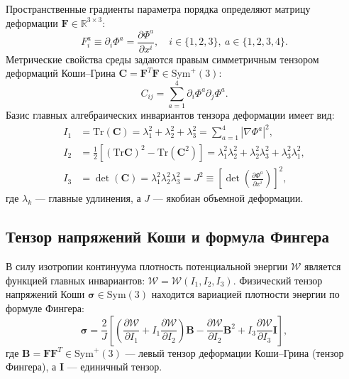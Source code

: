 \documentclass[11pt,a4paper]{article}
\theoremstyle{definition}
\theoremstyle{remark}
\begin{document}
Пространственные градиенты параметра порядка определяют матрицу деформации $\mathbf{F} \in \mathbb{R}^{3 \times 3}$:
\begin{equation}
    F_i^a \equiv \partial_i \Phi^a = \frac{\partial \Phi^a}{\partial x^i}, \quad i \in \{1,2,3\}, \ a \in \{1,2,3,4\}.
\end{equation}
Метрические свойства среды задаются правым симметричным тензором деформаций Коши--Грина $\mathbf{C} = \mathbf{F}^T \mathbf{F} \in \mathrm{Sym}^+(3)$:
\begin{equation}
    C_{ij} = \sum_{a=1}^4 \partial_i \Phi^a \partial_j \Phi^a.
\end{equation}
Базис главных алгебраических инвариантов тензора деформации имеет вид:
\begin{align}
    I_1 &= \mathrm{Tr}(\mathbf{C}) = \lambda_1^2 + \lambda_2^2 + \lambda_3^2 = \sum_{a=1}^4 |\nabla \Phi^a|^2, \\
    I_2 &= \frac{1}{2} \left[ (\mathrm{Tr}\mathbf{C})^2 - \mathrm{Tr}(\mathbf{C}^2) \right] = \lambda_1^2 \lambda_2^2 + \lambda_2^2 \lambda_3^2 + \lambda_3^2 \lambda_1^2, \\
    I_3 &= \det(\mathbf{C}) = \lambda_1^2 \lambda_2^2 \lambda_3^2 = J^2 \equiv \left[ \det\left(\frac{\partial \Phi^a}{\partial x^i}\right) \right]^2,
\end{align}
где $\lambda_k$ --- главные удлинения, а $J$ --- якобиан объемной деформации.

\subsection{Тензор напряжений Коши и формула Фингера}
В силу изотропии континуума плотность потенциальной энергии $\mathcal{W}$ является функцией главных инвариантов: $\mathcal{W} = \mathcal{W}(I_1, I_2, I_3)$. Физический тензор напряжений Коши $\boldsymbol{\sigma} \in \mathrm{Sym}(3)$ находится вариацией плотности энергии по формуле Фингера:
\begin{equation}
    \boldsymbol{\sigma} = \frac{2}{J} \left[ \left( \frac{\partial \mathcal{W}}{\partial I_1} + I_1 \frac{\partial \mathcal{W}}{\partial I_2} \right) \mathbf{B} - \frac{\partial \mathcal{W}}{\partial I_2} \mathbf{B}^2 + I_3 \frac{\partial \mathcal{W}}{\partial I_3} \mathbf{I} \right],
    \label{eq:finger_stress}
\end{equation}
где $\mathbf{B} = \mathbf{F} \mathbf{F}^T \in \mathrm{Sym}^+(3)$ --- левый тензор деформации Коши--Грина (тензор Фингера), а $\mathbf{I}$ --- единичный тензор.
\end{document}
